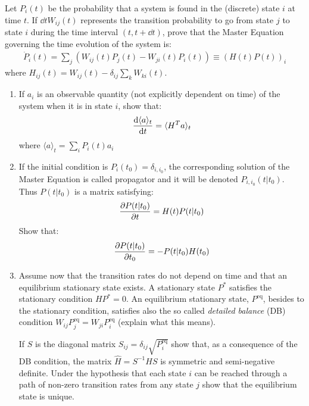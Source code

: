 \documentclass[../template.tex]{subfiles}
\begin{document}
\begin{exo}
    Let $P_i(t)$ be the probability that a system is found in the (discrete) state $i$ at time $t$. If $\dd{t} W_{ij}(t)$ represents the transition probability to go from state $j$ to state $i$ during the time interval $(t, t+ \dd{t})$, prove that the Master Equation governing the time evolution of the system is:
    \begin{align*}
        \dot{P}_i(t) = \sum_j (W_{ij}(t) P_j(t) - W_{ji}(t)P_i(t)) \equiv (H(t)P(t))_i 
    \end{align*}
    where $H_{ij}(t) = W_{ij}(t) - \delta_{ij} \sum_k W_{ki}(t)$.

    \begin{enumerate}
        \item If $a_i$ is an observable quantity (not explicitly dependent on time) of the system when it is in state $i$, show that:
        \begin{align*}
            \dv{\langle a \rangle_t}{t} = \langle H^T a \rangle_t
        \end{align*}
        where $\langle a \rangle_t = \sum_i P_i(t) a_i$
        \item If the initial condition is $P_i(t_0) = \delta_{i,i_0}$, the corresponding solution of the Master Equation is called propagator and it will be denoted $P_{i, i_0}(t|t_0)$. Thus $P(t|t_0)$ is a matrix satisfying:
        \begin{align*}
            \pdv{P(t|t_0)}{t} = H(t) P(t|t_0)
        \end{align*}
        Show that:
        \begin{align*}
            \pdv{P(t|t_0)}{t_0} = -P(t|t_0) H(t_0)
        \end{align*}
        \item Assume now that the transition rates do not depend on time and that an equilibrium stationary state exists. A stationary state $P^*$ satisfies the stationary condition $HP^* = 0$. An equilibrium stationary state, $P^{\mathrm{eq}}$, besides to the stationary condition, satisfies also the so called \textit{detailed balance} (DB) condition $W_{ij} P_j^{\mathrm{eq}} = W_{ji} P_i^{\mathrm{eq}}$ (explain what this means). 
        
        If $S$ is the diagonal matrix $S_{ij} = \delta_{ij} \sqrt{P_i^{\mathrm{eq}}}$ show that, as a consequence of the DB condition, the matrix $\hat{H} = S^{-1} H S$ is symmetric and semi-negative definite. Under the hypothesis that each state $i$ can be reached through a path of non-zero transition rates from any state $j$ show that the equilibrium state is unique.
    \end{enumerate}


\end{exo}
\end{document}
